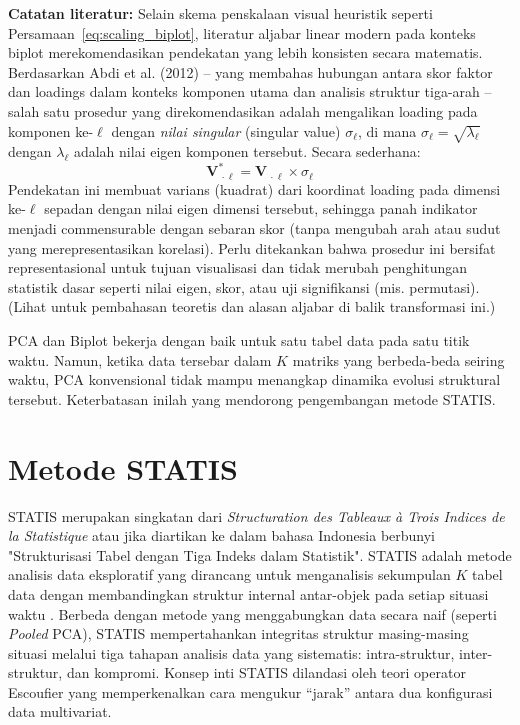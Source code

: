 \noindent
\textbf{Catatan literatur:} Selain skema penskalaan visual heuristik seperti Persamaan~\ref{eq:scaling_biplot}, literatur aljabar linear modern pada konteks biplot merekomendasikan pendekatan yang lebih konsisten secara matematis. Berdasarkan Abdi et al. (2012) -- yang membahas hubungan antara skor faktor dan loadings dalam konteks komponen utama dan analisis struktur tiga-arah -- salah satu prosedur yang direkomendasikan adalah mengalikan loading pada komponen ke-$\ell$ dengan \emph{nilai singular} (singular value) $\sigma_{\ell}$, di mana $\sigma_{\ell}=\sqrt{\lambda_{\ell}}$ dengan $\lambda_{\ell}$ adalah nilai eigen komponen tersebut. Secara sederhana:
\begin{equation}
  \mathbf{V}^*_{\,\cdot\ell} = \mathbf{V}_{\,\cdot\ell} \times \sigma_{\ell}
\end{equation}
Pendekatan ini membuat varians (kuadrat) dari koordinat loading pada dimensi ke-$\ell$ sepadan dengan nilai eigen dimensi tersebut, sehingga panah indikator menjadi commensurable dengan sebaran skor (tanpa mengubah arah atau sudut yang merepresentasikan korelasi). Perlu ditekankan bahwa prosedur ini bersifat representasional untuk tujuan visualisasi dan tidak merubah penghitungan statistik dasar seperti nilai eigen, skor, atau uji signifikansi (mis. permutasi). (Lihat \citet{abdi2012} untuk pembahasan teoretis dan alasan aljabar di balik transformasi ini.)

PCA dan Biplot bekerja dengan baik untuk satu tabel data pada satu titik waktu. Namun, ketika data tersebar dalam $K$ matriks yang berbeda-beda seiring waktu, PCA konvensional tidak mampu menangkap dinamika evolusi struktural tersebut. Keterbatasan inilah yang mendorong pengembangan metode STATIS.

\section{\normalsize Metode STATIS}

STATIS merupakan singkatan dari \textit{Structuration des Tableaux à Trois Indices de la Statistique} atau jika diartikan ke dalam bahasa Indonesia berbunyi "Strukturisasi Tabel dengan Tiga Indeks dalam Statistik". STATIS adalah metode analisis data eksploratif yang dirancang untuk menganalisis sekumpulan $K$ tabel data dengan membandingkan struktur internal antar-objek pada setiap situasi waktu \citep{lavit94}. Berbeda dengan metode yang menggabungkan data secara naif (seperti \textit{Pooled} PCA), STATIS mempertahankan integritas struktur masing-masing situasi melalui tiga tahapan analisis data yang sistematis: intra-struktur, inter-struktur, dan kompromi. Konsep inti STATIS dilandasi oleh teori operator Escoufier \citep{escoufier1973} yang memperkenalkan cara mengukur ``jarak'' antara dua konfigurasi data multivariat.

